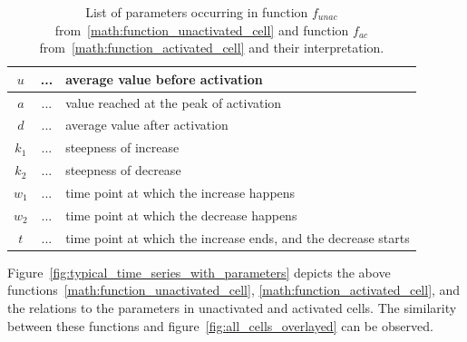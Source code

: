 \begin{table}[h!]
	\centering
	\begin{tabular}{|ccl|}
		\hline
		$u$ & ... & average value before activation\\
		\hline
		$a$ & ... & value reached at the peak of activation\\
		\hline
		$d$ & ... & average value after activation\\
		\hline
		$k_1$ & ... & steepness of increase\\
		\hline
		$k_2$ & ... & steepness of decrease\\
		\hline
		$w_1$ & ... & time point at which the increase happens\\
		\hline
		$w_2$ & ... & time point at which the decrease happens\\
		\hline
		$t$ & ... & time point at which the increase ends, and the decrease starts\\
		\hline
	\end{tabular}
	\caption{List of parameters occurring in function $f_{unac}$ from~\ref{math:function_unactivated_cell} and function $f_{ac}$ from~\ref{math:function_activated_cell} and their interpretation.}
	\label{tab:parameters}
\end{table}

Figure~\ref{fig:typical_time_series_with_parameters} depicts the above functions~\ref{math:function_unactivated_cell}, \ref{math:function_activated_cell}, and the relations to the parameters in unactivated and activated cells. The similarity between these functions and figure~\ref{fig:all_cells_overlayed} can be observed.


